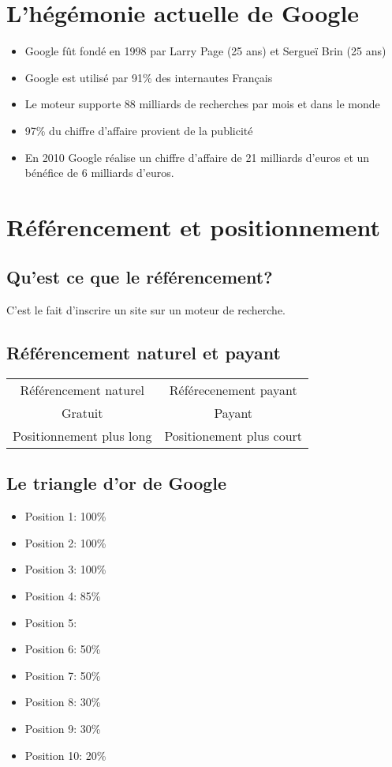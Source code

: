 \documentclass[12pt,a4paper,openany]{report}
\begin{document}
	\section{L'hégémonie actuelle de Google}
	\begin{itemize}
		\item Google fût fondé en 1998 par Larry Page (25 ans) et Sergueï Brin (25 ans)
		\item Google est utilisé par 91\% des internautes Français
		\item Le moteur supporte 88 milliards de recherches par mois et dans le monde
		\item 97\% du chiffre d'affaire provient de la publicité
		\item En 2010 Google réalise un chiffre d'affaire de 21 milliards d'euros et un bénéfice 
			de 6 milliards d'euros.
	\end{itemize}
	\section{Référencement et positionnement}
	\subsection{Qu'est ce que le référencement?} C'est le fait d'inscrire un site sur un moteur de recherche.
	\subsection{Référencement naturel et payant}
	\begin{tabular}{cc}
		Référencement naturel & Référecenement payant\\
		Gratuit & Payant\\
		Positionnement plus long & Positionement plus court \\
	\end{tabular}

	\subsection{Le triangle d'or de Google} 
	\begin{itemize}
		\item Position 1: 100\% 
		\item Position 2: 100\% 
		\item Position 3: 100\% 
		\item Position 4: 85\% 
		\item Position 5:  
		\item Position 6: 50\%
		\item Position 7: 50\%
		\item Position 8: 30\%
		\item Position 9: 30\%
		\item Position 10: 20\%
	\end{itemize}
\end{document}

